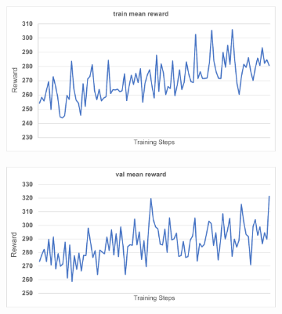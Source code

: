  




\begin{figure}[!h]
    \centering
    \begin{subfigure}[b]{0.48\textwidth}
         \centering
         \includegraphics[width=1\textwidth,scale=0.9]{images/twitter_plots/twitter_mean_reward.pdf}
         \caption{}
     \end{subfigure}
     \begin{subfigure}[b]{0.48\textwidth}
         \centering
         \includegraphics[width=1\textwidth,scale=0.9]{images/twitter_plots/twitter_sample_mean_reward.pdf}
         \caption{}
     \end{subfigure}    


\end{figure}
